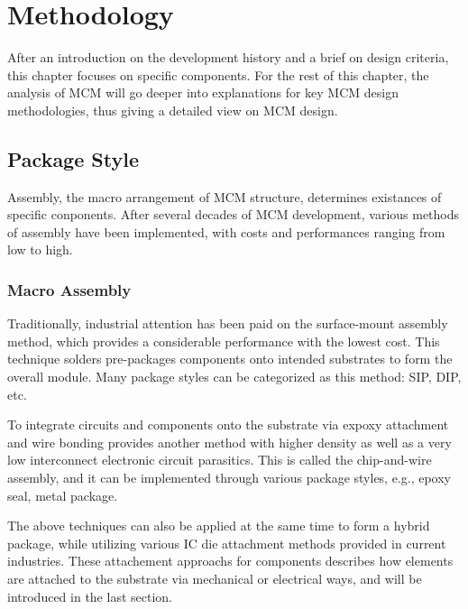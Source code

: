 
\chapter{Methodology}
\begin{spacing}{1.5}
\setlength{\parskip}{0.3in}

After an introduction on the development history and a brief on design criteria, this chapter focuses on specific components. For the rest of this chapter, the analysis of MCM will go deeper into explanations for key MCM design methodologies, thus giving a detailed view on MCM design. 

\section{Package Style}

Assembly, the macro arrangement of MCM structure, determines existances of specific conponents. After several decades of MCM development, various methods of assembly have been implemented, with costs and performances ranging from low to high. 

\subsection{Macro Assembly} 

Traditionally, industrial attention has been paid on the surface-mount assembly method, which provides a considerable performance with the lowest cost. This technique solders pre-packages components onto intended substrates to form the overall module. Many package styles can be categorized as this method: SIP, DIP, etc. 

To integrate circuits and components onto the substrate via expoxy attachment and wire bonding provides another method with higher density as well as a very low interconnect electronic circuit parasitics. This is called the chip-and-wire assembly, and it can be implemented through various package styles, e.g., epoxy seal, metal package. 

The above techniques can also be applied at the same time to form a hybrid package, while utilizing various IC die attachment methods provided in current industries. These attachement approachs for components describes how elements are attached to the substrate via mechanical or electrical ways, and will be introduced in the last section. \cite{licari1998hybrid}


\end{spacing}
